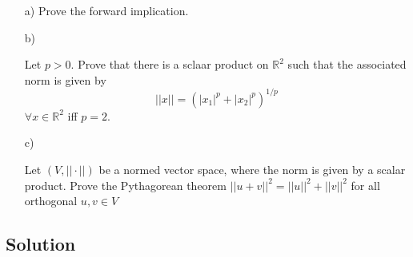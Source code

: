 \documentclass[10pt]{article}
\numberwithin{equation}{section}
\begin{document}
\begin{enumerate}
\item[a)]{
    Prove the forward implication.
  }
\item[b)]{
    Let $p > 0$. Prove that there is a sclaar product on $\mathbb{R}^2$ such that the associated norm is given by 
$$||x|| = (|x_1|^p + |x_2|^p)^{1/p}$$
$\forall x \in \mathbb{R}^2$ iff $p =2$.

  }
\item[c)]{
    Let $(V, ||\cdot||)$ be a normed vector space, where the norm is given by a scalar product. Prove the Pythagorean theorem $||u + v||^2 = ||u||^2 + ||v||^2$ for all orthogonal $u,v \in V$

  }
\end{enumerate}
\subsection*{Solution}
\end{document}
